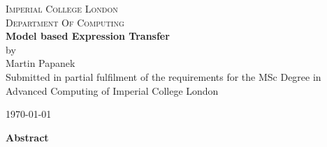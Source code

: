 \documentclass[11pt,a4paper,twoside]{report}
\begin{document}
\setcounter{secnumdepth}{3}
\setcounter{tocdepth}{3}


\makeatletter
\renewcommand*\env@matrix[1][*\c@MaxMatrixCols c]{%
  \hskip -\arraycolsep
  \let\@ifnextchar\new@ifnextchar
  \array{#1}}
\makeatother

\begin{titlepage}

\begin{center}


\textsc{\LARGE Imperial College London}\\[1cm]
\textsc{\LARGE Department Of Computing}\\[5.5cm]


{ \huge \bfseries Model based Expression Transfer}\\[1cm]
\LARGE by\\[1cm]
\LARGE Martin Papanek\\[7.5cm]



\normalsize Submitted in partial fulfilment of the requirements for the MSc Degree in Advanced Computing of Imperial College London\\[3.5cm]

\vfill

{\large \today}

\end{center}

\end{titlepage}

\begin{center}
\LARGE \textbf{Abstract}
\end{center}

\newpage
\end{document}

